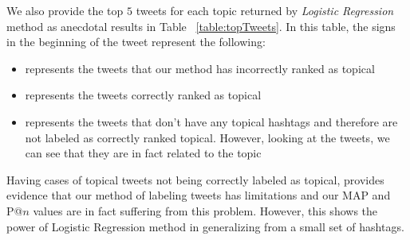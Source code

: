 We also provide the top $5$ tweets for each topic returned by \textit{Logistic Regression} method as anecdotal results in Table ~\ref{table:topTweets}. In this table, the signs in the beginning of the tweet represent the following:
\begin{itemize}
\item \xmark represents the tweets that our method has incorrectly ranked as topical
\item \checkmark represents the tweets correctly ranked as topical
\item \starmark represents the tweets that don't have any topical hashtags and therefore are not labeled as correctly ranked topical. However, looking at the tweets, we can see that they are in fact related to the topic
\end{itemize}  

Having cases of topical tweets not being correctly labeled as topical, provides evidence that our method of labeling tweets has limitations and our MAP and P@$n$ values are in fact suffering from this problem. However, this shows the power of Logistic Regression method in generalizing from a small set of hashtags.

